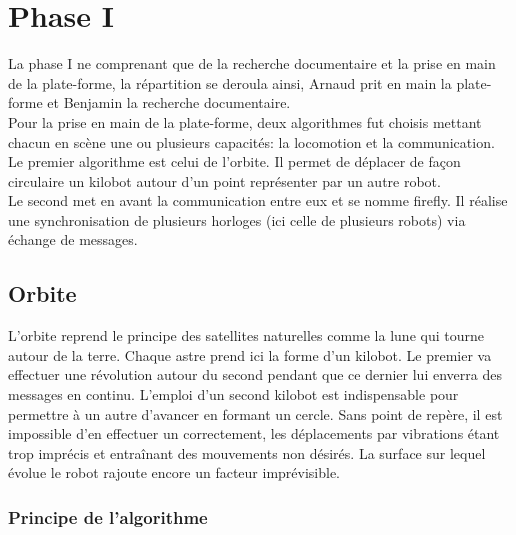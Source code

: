 \documentclass[a4paper,8pt]{report}
\begin{document}
\medskip

\section*{Phase I}\label{sec:name}

La phase I ne comprenant que de la recherche documentaire et la prise en main de la plate-forme, la r\'epartition se deroula ainsi, Arnaud prit en main la plate-forme et Benjamin la recherche documentaire.\\
Pour la prise en main de la plate-forme, deux algorithmes fut choisis mettant chacun en scène une ou plusieurs capacités: la locomotion et la communication.\\
Le premier algorithme est celui de l'orbite. Il permet de déplacer de façon circulaire un kilobot autour d'un point représenter par un autre robot.\\
Le second met en avant la communication entre eux et se nomme firefly. Il réalise une synchronisation de plusieurs horloges (ici celle de plusieurs robots) via échange de messages.\\

\subsection*{Orbite}\label{subsec:name}

L'orbite reprend le principe des satellites naturelles comme la lune qui tourne autour de la terre. Chaque astre prend ici la forme d'un kilobot. Le premier va effectuer une révolution autour du second pendant que ce dernier lui enverra des messages en continu. L'emploi d'un second kilobot est indispensable pour permettre à un autre d'avancer en formant un cercle. Sans point de repère, il est impossible d'en effectuer un correctement, les déplacements par vibrations étant trop imprécis et entraînant des mouvements non désirés. La surface sur lequel évolue le robot rajoute encore un facteur imprévisible.

\subsubsection{Principe de l'algorithme}\label{subsubsec:name}
\end{document}
